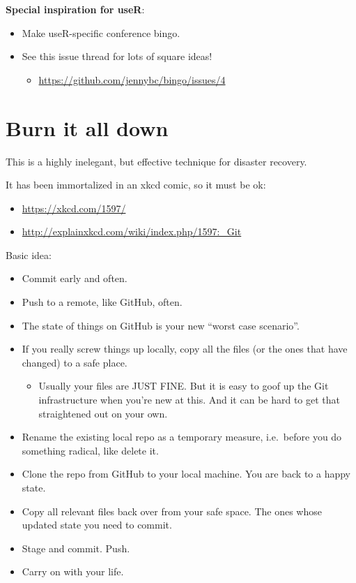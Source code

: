 \documentclass[
]{book}
\providecommand{\tightlist}{%
  \setlength{\itemsep}{0pt}\setlength{\parskip}{0pt}}
\begin{document}
\textbf{Special inspiration for useR}:

\begin{itemize}
\tightlist
\item
  Make useR-specific conference bingo.
\item
  See this issue thread for lots of square ideas!

  \begin{itemize}
  \tightlist
  \item
    \url{https://github.com/jennybc/bingo/issues/4}
  \end{itemize}
\end{itemize}

\chapter{Burn it all down}\label{burn}

This is a highly inelegant, but effective technique for disaster recovery.

It has been immortalized in an xkcd comic, so it must be ok:

\begin{itemize}
\tightlist
\item
  \url{https://xkcd.com/1597/}
\item
  \url{http://explainxkcd.com/wiki/index.php/1597:_Git}
\end{itemize}

Basic idea:

\begin{itemize}
\tightlist
\item
  Commit early and often.
\item
  Push to a remote, like GitHub, often.
\item
  The state of things on GitHub is your new ``worst case scenario''.
\item
  If you really screw things up locally, copy all the files (or the ones that have changed) to a safe place.

  \begin{itemize}
  \tightlist
  \item
    Usually your files are JUST FINE. But it is easy to goof up the Git infrastructure when you're new at this. And it can be hard to get that straightened out on your own.
  \end{itemize}
\item
  Rename the existing local repo as a temporary measure, i.e.~before you do something radical, like delete it.
\item
  Clone the repo from GitHub to your local machine. You are back to a happy state.
\item
  Copy all relevant files back over from your safe space. The ones whose updated state you need to commit.
\item
  Stage and commit. Push.
\item
  Carry on with your life.
\end{itemize}
\end{document}
